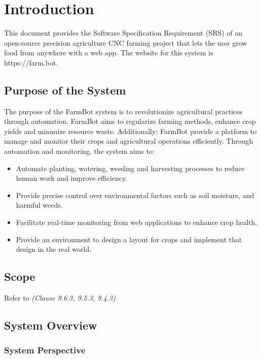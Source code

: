 
\chapter{Introduction} \label{introduction}

This document provides the Software Specification Requirement (SRS) of an open-source precision agriculture CNC farming project that lets the user grow food from anywhere with a web app. The website for this system is https://farm.bot.

\section{Purpose of the System }

The purpose of the FarmBot system is to revolutionize agricultural practices through automation. FarmBot aims to regularize farming methods, enhance crop yields and minimize resource waste. Additionally; FarmBot provide a platform to manage and monitor their crops and agricultural operations efficiently. Through automation and monitoring, the system aims to:

\begin{itemize}
    \item Automate planting, watering, weeding and harvesting processes to reduce human work and improve efficiency.
    \item Provide precise control over environmental factors such as soil moisture, and harmful weeds.
    \item Facilitate real-time monitoring from web applications to enhance crop health.
    \item Provide an environment to design a layout for crops and implement that design in the real world.
\end{itemize}

\section{Scope}

Refer to \textit{(Clause 9.6.3, 9.5.3, 9.4.3)}

\section{System Overview}


\subsection{System Perspective}


